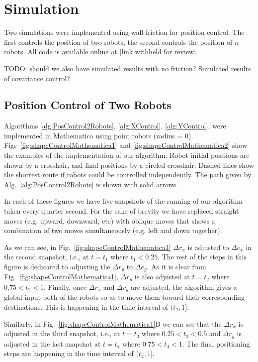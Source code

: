 
\section{Simulation}\label{sec:simulation}

Two simulations were implemented using wall-friction for position control.  The first controls the position of two robots, the second controls the position of $n$ robots.  All code is available online at [link withheld for review].

TODO: should we also have simulated results with no friction?  Simulated results of covariance control?


\subsection{Position Control of Two Robots}

Algorithms \ref{alg:PosControl2Robots}, \ref{alg:XControl}, \ref{alg:YControl}, were implemented in Mathematica using point robots (radius = $0$).  Figs~\ref{fig:shapeControlMathematica1} and \ref{fig:shapeControlMathematica2} show the examples of the implementation of our algorithm. 
Robot initial positions are shown by a crosshair, and final positions by a circled crosshair.  Dashed lines show the shortest route if robots could be controlled independently.  The path given by  Alg.\ \ref{alg:PosControl2Robots} is shown with solid arrows.

In each of these figures we have five snapshots of the running of our algorithm taken every quarter second. For the sake of brevity we have replaced straight moves (e.g. upward, downward, etc) with oblique moves that shows a combination of two moves simultaneously (e.g. left and down together). 

As we can see, in Fig.~\ref{fig:shapeControlMathematica1} $\Delta r_x$ is adjusted to $\Delta e_x$ in the second snapshot, i.e., at $t = t_1$ where $t_1<0.25$. The rest of the steps in this figure is dedicated to adjusting the $\Delta r_y$ to $\Delta e_y$. As it is clear from Fig.~\ref{fig:shapeControlMathematica1}, $\Delta r_y$ is also adjusted at $t = t_2$ where $0.75<t_2<1$. Finally, once $\Delta r_x$ and $\Delta r_y$ are adjusted, the algorithm gives a global input both of the robots so as to move them toward their corresponding destinations. This is happening in the time interval of $(t_2,1]$.

Similarly, in Fig.~\ref{fig:shapeControlMathematica1}B we can see that the $\Delta r_x$ is adjusted in the third snapshot, i.e., at $t=t_3$ where $0.25<t_3<0.5$ and $\Delta r_y$ is adjusted in the last snapshot at $t=t_4$ where $0.75<t_4<1$. The final positioning steps are happening in the time interval of $(t_4,1]$.

